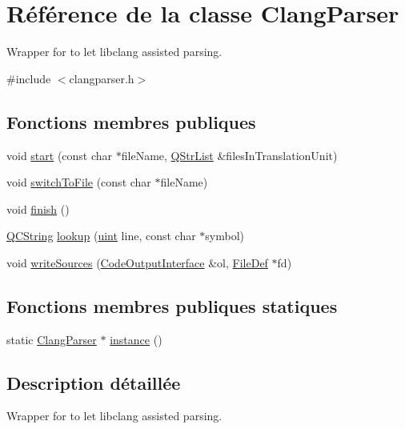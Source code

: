 \hypertarget{class_clang_parser}{}\section{Référence de la classe Clang\+Parser}
\label{class_clang_parser}


Wrapper for to let libclang assisted parsing.  




{\ttfamily \#include $<$clangparser.\+h$>$}

\subsection*{Fonctions membres publiques}
\begin{DoxyCompactItemize}
\item 
void \hyperlink{class_clang_parser_a6e336d45ecc4ec146bab1696fb26bd77}{start} (const char $\ast$file\+Name, \hyperlink{class_q_str_list}{Q\+Str\+List} \&files\+In\+Translation\+Unit)
\item 
void \hyperlink{class_clang_parser_a6b4d5e7994ee8d875f5f9bf67e8550e1}{switch\+To\+File} (const char $\ast$file\+Name)
\item 
void \hyperlink{class_clang_parser_ac7ccfd4ea36fc8c347e8f794109678c8}{finish} ()
\item 
\hyperlink{class_q_c_string}{Q\+C\+String} \hyperlink{class_clang_parser_a2617d0cd62525f13d53a896247ac75d6}{lookup} (\hyperlink{qglobal_8h_a4d3943ddea65db7163a58e6c7e8df95a}{uint} line, const char $\ast$symbol)
\item 
void \hyperlink{class_clang_parser_a85070c801afbece678e44e5af2cf4c4b}{write\+Sources} (\hyperlink{class_code_output_interface}{Code\+Output\+Interface} \&ol, \hyperlink{class_file_def}{File\+Def} $\ast$fd)
\end{DoxyCompactItemize}
\subsection*{Fonctions membres publiques statiques}
\begin{DoxyCompactItemize}
\item 
static \hyperlink{class_clang_parser}{Clang\+Parser} $\ast$ \hyperlink{class_clang_parser_add1060dd5febd4664f6038a87d87b8cd}{instance} ()
\end{DoxyCompactItemize}


\subsection{Description détaillée}
Wrapper for to let libclang assisted parsing. 

